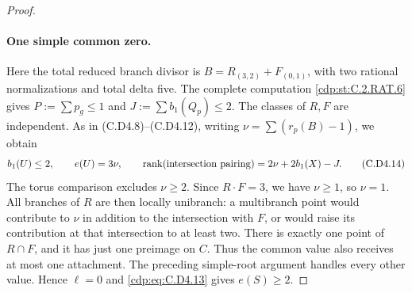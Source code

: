 \begin{proof}
\paragraph{One simple common zero.}
Here the total reduced branch divisor is
$B=R_{(3,2)}+F_{(0,1)}$, with two rational normalizations
and total delta five. The complete computation \ref{cdp:st:C.2.RAT.6}
gives $P:=\sum p_g\le1$ and
$J:=\sum b_1(Q_p)\le2$. The classes of $R,F$ are
independent. As in (C.D4.8)--(C.D4.12), writing
$\nu=\sum(r_p(B)-1)$, we obtain
\[
 b_1(U)\le2,\qquad e(U)=3\nu,\qquad
 \operatorname{rank}(\hbox{intersection pairing})
                         =2\nu+2b_1(X)-J.
\tag{C.D4.14}\label{cdp:eq:C.D4.14}
\]
The torus comparison excludes $\nu\ge2$. Since $R\cdot F=3$,
we have $\nu\ge1$, so $\nu=1$. All branches of $R$ are
then locally unibranch: a multibranch point would contribute
to $\nu$ in addition to the intersection with $F$, or would
raise its contribution at that intersection to at least two.
There is exactly one point of $R\cap F$, and it has just
one preimage on $C$. Thus the common value also receives
at most one attachment. The preceding simple-root argument
handles every other value. Hence $\ell=0$ and \eqref{cdp:eq:C.D4.13}
gives $e(S)\ge2$.


\end{proof}
